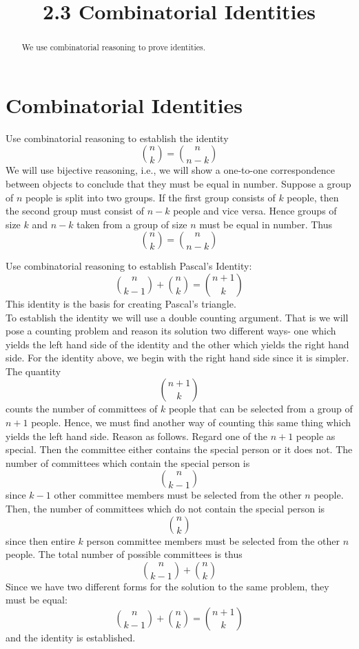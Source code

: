 \documentclass[handout]{ximera}
\title{2.3 Combinatorial Identities}
\begin{document}
\begin{abstract}
We use combinatorial reasoning to prove identities.
\end{abstract}

\maketitle

\section{Combinatorial Identities}

\begin{example}[example 1]
Use combinatorial reasoning to establish the identity
\[
\binom{n}{k}  = \binom{n}{n-k}
\]
We will use bijective reasoning, i.e., we will show a one-to-one correspondence between objects to 
conclude that they must be equal in number.
Suppose a group of $n$ people is split into two groups. If the first group consists of $k$ people, 
then the second group must consist of $n-k$ people and vice versa.
 Hence groups of size $k$ and $n-k$ taken from a group of size $n$ must be equal in number. Thus
\[
\binom{n}{k}  = \binom{n}{n-k}
\]
\end{example}



\begin{example}[example 2]
Use combinatorial reasoning to establish Pascal's Identity:
\[
\binom{n}{k-1} + \binom{n}{k} = \binom{n+1}{k}
\]
This identity is the basis for creating Pascal's triangle.\\
To establish the identity we will use a double counting argument. 
That is we will pose a counting problem and reason its 
solution two different ways- one which yields the left hand side of the identity and the other which
 yields the right hand side. For the identity above, we begin with the right hand 
 side since it is simpler.  The quantity
 \[
 \binom{n+1}{k}
 \]
 counts the number of committees of $k$ people that can be selected from a group of $n+1$ people. 
 Hence, we must find another way of counting this same thing which yields the left hand side. 
 Reason as follows. Regard one of the $n+1$ people as special. 
 Then the committee either contains the special person or it does not.
 The number of committees which contain the special person is 
 \[
 \binom{n}{k-1}
 \]
 since $k-1$ other committee members must be selected from the other $n$ people.
 Then, the number of committees which do not contain the special person is 
 \[
 \binom{n}{k}
 \]
 since then entire $k$ person committee members must be selected from the other $n$ people.
 The total number of possible committees is thus
 \[
\binom{n}{k-1} + \binom{n}{k}
\]
Since we have two different forms for the solution to the same problem, they must be equal:
\[
\binom{n}{k-1} + \binom{n}{k} = \binom{n+1}{k}
\]
and the identity is established.
\end{example}
\end{document}

